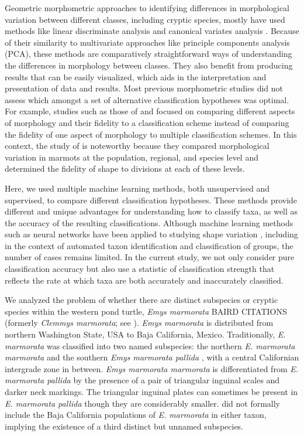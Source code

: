 \documentclass[12pt,letterpaper]{article}
\begin{document}
Geometric morphometric approaches to identifying differences in morphological variation between different classes, including cryptic species, mostly have used methods like linear discriminate analysis and canonical variates analysis \citep{Polly2003,Zelditch2004,Gaubert2005b,Gunduz2007,Polly2007a,Francoy2009,Sztencel-Jabonka2009,MitrovskiBogdanovic2013}. Because of their similarity to multivariate approaches like principle components analysis (PCA), these methods are comparatively straightforward ways of understanding the differences in morphology between classes. They also benefit from producing results that can be easily visualized, which aids in the interpretation and presentation of data and results. Most previous morphometric studies did not assess which amongst a set of alternative classification hypotheses was optimal. For example, studies such as those of \citet{Caumul2005a} and \citet{Polly2007a} focused on comparing different aspects of morphology and their fidelity to a classification scheme instead of comparing the fidelity of one aspect of morphology to multiple classification schemes. In this context, the study of \citet{Cardini2009a} is noteworthy because they compared morphological variation in marmots at the population, regional, and species level and determined the fidelity of shape to divisions at each of these levels.

Here, we used multiple machine learning methods, both unsupervised and supervised, to compare different classification hypotheses. These methods provide different and unique advantages for understanding how to classify taxa, as well as the accuracy of the resulting classifications. Although machine learning methods such as neural networks have been applied to studying shape variation \citep{Baylac2003,Dobigny2003,MacLeod2007,VandenBrink2011}, including in the context of automated taxon identification and classification of groups, the number of cases remains limited. In the current study, we not only consider pure classification accuracy but also use a statistic of classification strength that reflects the rate at which taxa are both accurately and inaccurately classified. 


We analyzed the problem of whether there are distinct subspecies or cryptic species within the western pond turtle, \textit{Emys marmorata} BAIRD CITATIONS (formerly \emph{Clemmys marmorata}; see \citealp{Feldman2002}). \textit{Emys marmorata} is distributed from northern Washington State, USA to Baja California, Mexico. Traditionally, \textit{E. marmorata} was classified into two named subspecies: the northern \textit{E. marmorata marmorata} and the southern \textit{Emys marmorata pallida} \citep{Seeliger1945}, with a central Californian intergrade zone in between. \textit{Emys marmorata marmorata} is differentiated from \textit{E. marmorata pallida} by the presence of a pair of triangular inguinal scales and darker neck markings. The triangular inguinal plates can sometimes be present in \textit{E. marmorata pallida} though they are considerably smaller. \citet{Seeliger1945} did not formally include the Baja California populations of \textit{E. marmorata} in either taxon, implying the existence of a third distinct but unnamed subspecies.
\end{document}
